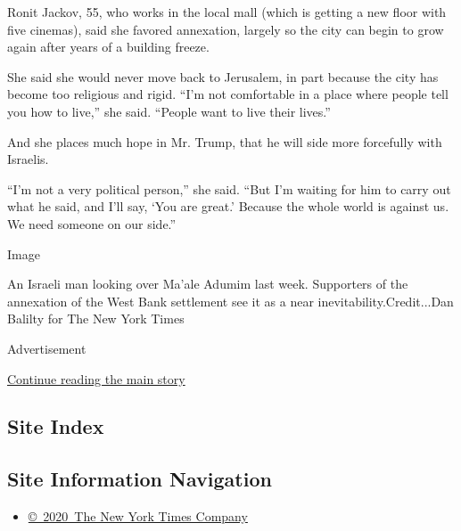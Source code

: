 Ronit Jackov, 55, who works in the local mall (which is getting a new
floor with five cinemas), said she favored annexation, largely so the
city can begin to grow again after years of a building freeze.

She said she would never move back to Jerusalem, in part because the
city has become too religious and rigid. ``I'm not comfortable in a
place where people tell you how to live,'' she said. ``People want to
live their lives.''

And she places much hope in Mr. Trump, that he will side more forcefully
with Israelis.

``I'm not a very political person,'' she said. ``But I'm waiting for him
to carry out what he said, and I'll say, `You are great.' Because the
whole world is against us. We need someone on our side.''

Image

An Israeli man looking over Ma'ale Adumim last week. Supporters of the
annexation of the West Bank settlement see it as a near
inevitability.Credit...Dan Balilty for The New York Times

Advertisement

\protect\hyperlink{after-bottom}{Continue reading the main story}

\hypertarget{site-index}{%
\subsection{Site Index}\label{site-index}}

\hypertarget{site-information-navigation}{%
\subsection{Site Information
Navigation}\label{site-information-navigation}}

\begin{itemize}
\tightlist
\item
  \href{https://help.nytimes3xbfgragh.onion/hc/en-us/articles/115014792127-Copyright-notice}{©~2020~The
  New York Times Company}
\end{itemize}

